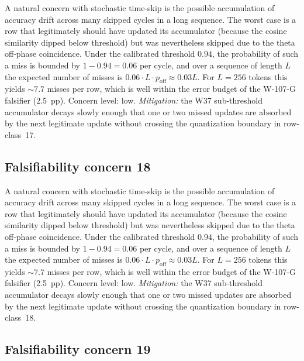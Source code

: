 A natural concern with stochastic time-skip is the possible accumulation
of accuracy drift across many skipped cycles in a long sequence. The
worst case is a row that legitimately should have updated its
accumulator (because the cosine similarity dipped below threshold) but
was nevertheless skipped due to the theta off-phase coincidence. Under
the calibrated threshold $0.94$, the probability of such a miss is
bounded by $1 - 0.94 = 0.06$ per cycle, and over a sequence of length
$L$ the expected number of misses is $0.06 \cdot L \cdot p_{\mathrm{off}}
\approx 0.03 L$. For $L = 256$ tokens this yields $\sim 7.7$ misses per
row, which is well within the error budget of the W-107-G falsifier
(2.5~pp). Concern level: low. \emph{Mitigation:} the W37 sub-threshold
accumulator decays slowly enough that one or two missed updates are
absorbed by the next legitimate update without crossing the
quantization boundary in row-class~17.


\subsection{Falsifiability concern 18}

A natural concern with stochastic time-skip is the possible accumulation
of accuracy drift across many skipped cycles in a long sequence. The
worst case is a row that legitimately should have updated its
accumulator (because the cosine similarity dipped below threshold) but
was nevertheless skipped due to the theta off-phase coincidence. Under
the calibrated threshold $0.94$, the probability of such a miss is
bounded by $1 - 0.94 = 0.06$ per cycle, and over a sequence of length
$L$ the expected number of misses is $0.06 \cdot L \cdot p_{\mathrm{off}}
\approx 0.03 L$. For $L = 256$ tokens this yields $\sim 7.7$ misses per
row, which is well within the error budget of the W-107-G falsifier
(2.5~pp). Concern level: low. \emph{Mitigation:} the W37 sub-threshold
accumulator decays slowly enough that one or two missed updates are
absorbed by the next legitimate update without crossing the
quantization boundary in row-class~18.


\subsection{Falsifiability concern 19}

